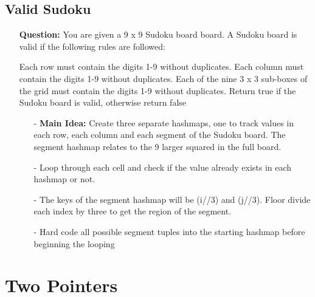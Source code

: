 \documentclass[12pt]{article}
\begin{document}
\subsection{Valid Sudoku}
\begin{enumerate}
  \item[] \textbf{Question:} You are given a 9 x 9 Sudoku board board. A Sudoku board is valid if the following rules are followed:

Each row must contain the digits 1-9 without duplicates.
Each column must contain the digits 1-9 without duplicates.
Each of the nine 3 x 3 sub-boxes of the grid must contain the digits 1-9 without duplicates.
Return true if the Sudoku board is valid, otherwise return false

    \begin{enumerate}
      \item[-] \textbf{Main Idea: } Create three separate hashmaps, one to track values in each row, each column and each segment of the Sudoku board. The segment hashmap relates to the 9 larger squared in the full board.
      \item[-] Loop through each cell and check if the value already exists in each hashmap or not. 
      \item[-] The keys of the segment hashmap will be (i//3) and (j//3). Floor divide each index by three to get the region of the segment.
      \item[-] Hard code all possible segment tuples into the starting hashmap before beginning the looping
    \end{enumerate}
\end{enumerate}



\section{Two Pointers}
\end{document}
